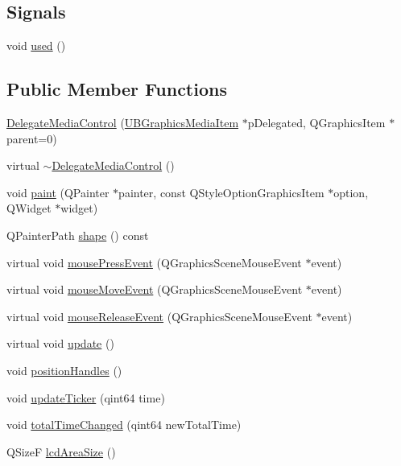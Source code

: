 \subsection*{Signals}
\begin{DoxyCompactItemize}
\item 
void \hyperlink{class_delegate_media_control_a750d5874b4b76748e648fa7a433a87e1}{used} ()
\end{DoxyCompactItemize}
\subsection*{Public Member Functions}
\begin{DoxyCompactItemize}
\item 
\hyperlink{class_delegate_media_control_a31c53908b3b591beade946286b2cf06d}{Delegate\-Media\-Control} (\hyperlink{class_u_b_graphics_media_item}{U\-B\-Graphics\-Media\-Item} $\ast$p\-Delegated, Q\-Graphics\-Item $\ast$parent=0)
\item 
virtual \hyperlink{class_delegate_media_control_a55d74623ac9cd55a4d88dbed422456ee}{$\sim$\-Delegate\-Media\-Control} ()
\item 
void \hyperlink{class_delegate_media_control_a92cda710b5277e70386ded97135742a5}{paint} (Q\-Painter $\ast$painter, const Q\-Style\-Option\-Graphics\-Item $\ast$option, Q\-Widget $\ast$widget)
\item 
Q\-Painter\-Path \hyperlink{class_delegate_media_control_a13834c535fe5c4445df5113af5d2b795}{shape} () const 
\item 
virtual void \hyperlink{class_delegate_media_control_a3913058c72f4551084bb30ad6a4806c7}{mouse\-Press\-Event} (Q\-Graphics\-Scene\-Mouse\-Event $\ast$event)
\item 
virtual void \hyperlink{class_delegate_media_control_ab39f60ffa2394305d26cdfde9edbf05f}{mouse\-Move\-Event} (Q\-Graphics\-Scene\-Mouse\-Event $\ast$event)
\item 
virtual void \hyperlink{class_delegate_media_control_ae406ff2527a878411d414336f85050dc}{mouse\-Release\-Event} (Q\-Graphics\-Scene\-Mouse\-Event $\ast$event)
\item 
virtual void \hyperlink{class_delegate_media_control_a94d2f24370dd05a8f479375dee461cd1}{update} ()
\item 
void \hyperlink{class_delegate_media_control_a6af0a98e1ae9093b906dfd44d1572952}{position\-Handles} ()
\item 
void \hyperlink{class_delegate_media_control_a463f01b70494794b7e54b273a1d0a412}{update\-Ticker} (qint64 time)
\item 
void \hyperlink{class_delegate_media_control_a18566e9073d0e81ed0de968b2511d226}{total\-Time\-Changed} (qint64 new\-Total\-Time)
\item 
Q\-Size\-F \hyperlink{class_delegate_media_control_a1c953c26adc9ddcfdd1208bef453aa96}{lcd\-Area\-Size} ()
\end{DoxyCompactItemize}

